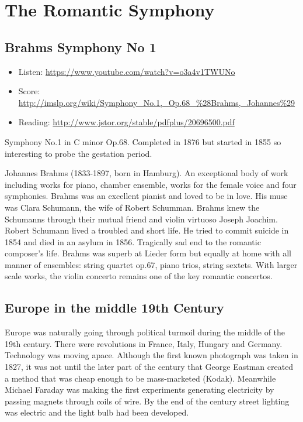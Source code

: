 
\chapter{The Romantic Symphony}
\label{romanticsymphony}


\section{Brahms Symphony No 1 }
\begin{itemize}
\item Listen: \url{https://www.youtube.com/watch?v=o3a4v1TWUNo}
\item Score: \url{http://imslp.org/wiki/Symphony_No.1,_Op.68_%28Brahms,_Johannes%29}
\item Reading: \url{http://www.jstor.org/stable/pdfplus/20696500.pdf}
\end{itemize}

Symphony No.1 in C minor Op.68. Completed in 1876 but started in 1855 so interesting to probe the gestation period. 

Johannes Brahms (1833-1897, born in Hamburg). An exceptional body of work including works for piano, chamber ensemble, works for the female voice and four symphonies. Brahms was an excellent pianist and loved to be in love. His muse was Clara Schumann, the wife of Robert Schumman. Brahms knew the Schumanns through their mutual friend and violin virtuoso Joseph Joachim. Robert Schumann lived a troubled and short life. He tried to commit suicide in 1854 and died in an asylum in 1856. Tragically sad end to the romantic composer's life. Brahms was superb at Lieder form but equally at home with all manner of ensembles: string quartet op.67, piano trios, string sextets. With larger scale works, the violin concerto remains one of the key romantic concertos. 

\section{Europe in the middle 19th Century}
Europe was naturally going through political turmoil during the middle of the 19th century. There were revolutions in France, Italy, Hungary and Germany. Technology was moving apace. Although the first known photograph was taken in 1827, it was not until the later part of the century that George Eastman created a method that was cheap enough to be mass-marketed (Kodak). Meanwhile Michael Faraday was making the first experiments generating electricity by passing magnets through coils of wire. By the end of the century street lighting was electric and the light bulb had been developed. 


